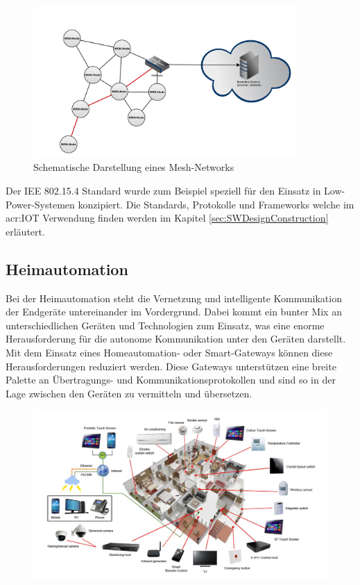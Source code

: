 \begin{figure}[!h]
  \centering
  \includegraphics[width=10cm]{./images/Mesh-Network}
  \caption{Schematische Darstellung eines Mesh-Networks}
\end{figure}


Der IEE 802.15.4 Standard wurde zum Beispiel speziell für den Einsatz in Low-Power-Systemen konzipiert. Die Standards, Protokolle und Frameworks welche im \gls{acr:IOT} Verwendung finden werden im Kapitel \ref{sec:SWDesignConstruction}  erläutert.


\subsection{Heimautomation}
Bei der Heimautomation steht die Vernetzung und intelligente Kommunikation der Endgeräte untereinander im Vordergrund. Dabei kommt ein bunter Mix an unterschiedlichen Geräten und Technologien zum Einsatz, was eine enorme Herausforderung für die autonome Kommunikation unter den Geräten darstellt. Mit dem Einsatz eines Homeautomation- oder Smart-Gateways können diese Herausforderungen reduziert werden. Diese Gateways unterstützen eine breite Palette an Übertragungs- und Kommunikationsprotokollen und sind so in der Lage zwischen den Geräten zu vermitteln und übersetzen.

\begin{figure}[!h]
  \centering
  \includegraphics[width=14cm]{./images/smart_home_system}
\end{figure}


